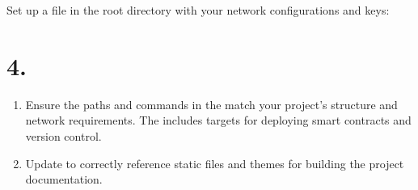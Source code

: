 \documentclass[letterpaper,10pt,english]{sphinxmanual}
\begin{document}
\begin{enumerate}
\sphinxAtStartPar
Set up a  file in the root directory with your network configurations and keys:

\begin{sphinxVerbatim}[commandchars=\\\{\}]
\end{sphinxVerbatim}

\end{enumerate}


\section{4. }
\label{\detokenize{quickstart:project-configuration}}\label{\detokenize{quickstart:configuration}}\begin{enumerate}
%
\item {} 
\sphinxAtStartPar
{}

\sphinxAtStartPar
Ensure the paths and commands in the  match your project’s structure and network requirements. The  includes targets for deploying smart contracts and version control.

\item {} 
\sphinxAtStartPar
{}

\sphinxAtStartPar
Update  to correctly reference static files and themes for building the project documentation.

\end{enumerate}
\end{document}

